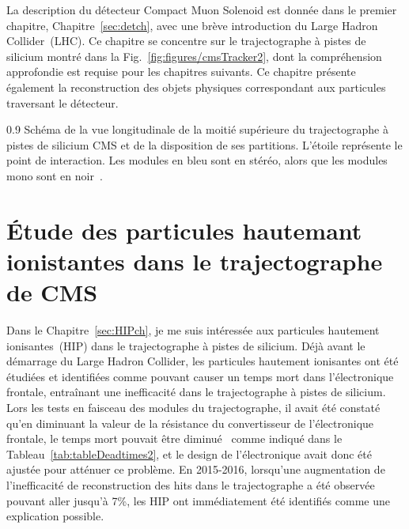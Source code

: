 La description du  détecteur Compact Muon Solenoid est donnée dans le premier chapitre, Chapitre~\ref{sec:detch}, avec une brève introduction du Large Hadron Collider~(LHC). Ce chapitre se concentre sur le trajectographe à pistes de silicium montré dans la Fig.~\ref{fig:figures/cmsTracker2}, dont la compréhension approfondie est requise pour les chapitres suivants. Ce chapitre présente également la reconstruction des objets physiques correspondant aux particules traversant le détecteur. 

                 {0.9}
                 { Schéma de la vue longitudinale de la moitié supérieure du trajectographe à pistes de silicium CMS et de la disposition de ses partitions. L'étoile représente le point de interaction. Les modules en bleu sont en stéréo, alors que les modules mono sont en noir~\cite{Chatrchyan:2014fea}.}

\section{Étude des particules hautemant ionistantes dans le trajectographe de CMS}

Dans le Chapitre~\ref{sec:HIPch}, je me suis intéressée aux particules hautement ionisantes~(HIP) dans le trajectographe à pistes de silicium. Déjà avant le démarrage du Large Hadron Collider, les particules hautement ionisantes ont été étudiées et identifiées comme pouvant causer un temps mort dans l'électronique frontale, entraînant une inefficacité dans le trajectographe à pistes de silicium. Lors les tests en faisceau des modules du trajectographe, il avait été constaté qu'en diminuant la valeur de la résistance du convertisseur de l’électronique frontale, le temps mort pouvait être diminué~\cite{Bainbridge:2004jc} comme indiqué dans le Tableau~\ref{tab:tableDeadtimes2}, et le design de l'électronique avait donc été ajustée pour atténuer ce problème. En 2015-2016, lorsqu'une augmentation de l'inefficacité de reconstruction des hits dans le trajectographe a été observée pouvant aller jusqu'à 7\%, les HIP ont immédiatement été identifiés comme une explication possible. 

